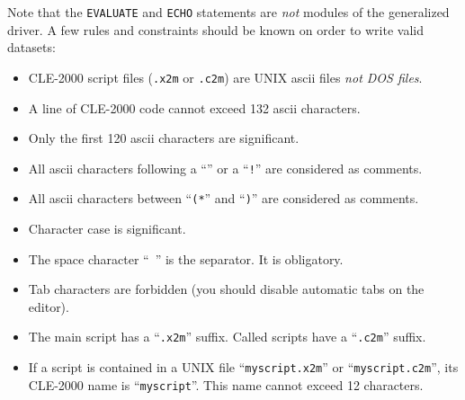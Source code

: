 \vskip 0.2cm

Note that the {\tt EVALUATE} and {\tt ECHO} statements are {\sl not} modules of the generalized driver. A few rules and constraints
should be known on order to write valid datasets:
\begin{itemize}
\item CLE-2000 script files ({\tt *.x2m} or {\tt *.c2m}) are UNIX {\sc ascii} files {\sl not DOS files}.
\item A line of CLE-2000 code cannot exceed 132 {\sc ascii} characters.
\item Only the first 120 {\sc ascii} characters are significant.
\item All {\sc ascii} characters following a ``{\tt *}'' or a ``{\tt !}'' are considered as comments.
\item All {\sc ascii} characters between ``{\tt (*}'' and ``{\tt *)}'' are considered as comments.
\item Character case is significant.
\item The space character ``~'' is the separator. It is obligatory.
\item Tab characters are forbidden (you should disable automatic tabs on the editor).
\item The main script has a ``{\tt .x2m}'' suffix. Called scripts have a ``{\tt .c2m}'' suffix.
\item If a script is contained in a UNIX file ``{\tt myscript.x2m}'' or ``{\tt myscript.c2m}'', its CLE-2000 name is ``{\tt myscript}''. This name cannot exceed 12 characters.
\end{itemize}

